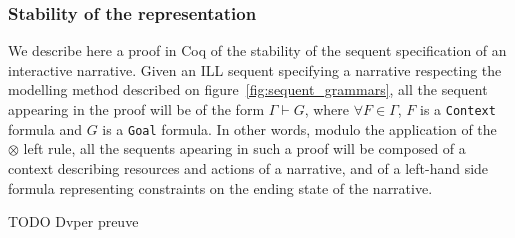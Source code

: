 \documentclass[runningheads,a4paper]{llncs}
\begin{document}
\subsubsection{Stability of the representation}
We describe here a proof in Coq of the stability of the sequent specification of an interactive narrative. Given an ILL sequent specifying a narrative respecting the modelling method described on figure~\ref{fig:sequent_grammars}, all the sequent appearing in the proof will be of the form $\Gamma\vdash G $, where $\forall F\in\Gamma$, $F$ is a \texttt{Context} formula and $G$ is a \texttt{Goal} formula. In other words, modulo the application of the $\otimes$ left rule, all the sequents apearing in such a proof will be composed of a context describing resources and actions of a narrative, and of a left-hand side formula representing constraints on the ending state of the narrative.

TODO Dvper preuve

\end{document}
